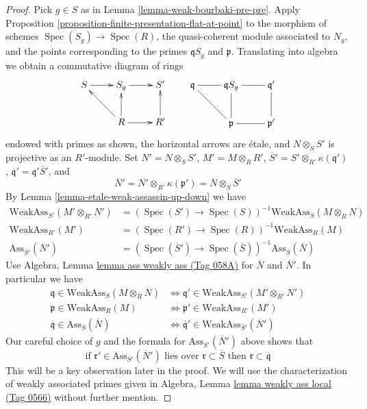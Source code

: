 \documentclass{amsart}
\theoremstyle{plain}
\theoremstyle{definition}
\theoremstyle{remark}
\numberwithin{equation}{subsection}
\def\Spec{\mathop{\mathrm{Spec}}}
\begin{document}
\begin{proof}
Pick $g \in S$ as in Lemma \ref{lemma-weak-bourbaki-pre-pre}.
Apply Proposition \ref{proposition-finite-presentation-flat-at-point}
to the morphism of schemes $\Spec(S_g) \to \Spec(R)$, the quasi-coherent
module associated to $N_g$, and the points
corresponding to the primes $\mathfrak qS_g$ and $\mathfrak p$. Translating
into algebra we obtain a commutative diagram of rings
$$
\xymatrix{
S \ar[r] & S_g \ar[r] & S' \\
& R \ar[lu] \ar[u] \ar[r] & R' \ar[u]
}
\quad\quad
\xymatrix{
\mathfrak q \ar@{-}[r] \ar@{-}[rd] &
\mathfrak qS_g \ar@{-}[d] \ar@{-}[r] & \mathfrak q' \ar@{-}[d] \\
& \mathfrak p \ar@{-}[r] & \mathfrak p'
}
$$
endowed with primes as shown, the horizontal arrows are \'etale,
and $N \otimes_S S'$ is projective as an $R'$-module. Set
$N' = N \otimes_S S'$, $M' = M \otimes_R R'$,
$\overline{S}' = S' \otimes_{R'} \kappa(\mathfrak q')$,
$\overline{\mathfrak q}' = \mathfrak q' \overline{S}'$,
and
$$
\overline{N}' = N' \otimes_{R'} \kappa(\mathfrak p') =
\overline{N} \otimes_{\overline{S}} \overline{S}'
$$
By Lemma \ref{lemma-etale-weak-assassin-up-down} we have
\begin{align*}
\text{WeakAss}_{S'}(M' \otimes_{R'} N') & =
(\Spec(S') \to \Spec(S))^{-1}\text{WeakAss}_S(M \otimes_R N) \\
\text{WeakAss}_{R'}(M') & =
(\Spec(R') \to \Spec(R))^{-1}\text{WeakAss}_R(M) \\
\text{Ass}_{\overline{S}'}(\overline{N}') & =
(\Spec(\overline{S}') \to \Spec(\overline{S}))^{-1}
\text{Ass}_{\overline{S}}(\overline{N})
\end{align*}
Use Algebra, Lemma \href{https://stacks.math.columbia.edu/tag/058A}{lemma ass weakly ass (Tag 058A)}
for $\overline{N}$ and $\overline{N}'$. In particular we have
\begin{align*}
\mathfrak q \in \text{WeakAss}_S(M \otimes_R N)
& \Leftrightarrow
\mathfrak q' \in \text{WeakAss}_{S'}(M' \otimes_{R'} N') \\
\mathfrak p \in \text{WeakAss}_R(M)
& \Leftrightarrow
\mathfrak p' \in \text{WeakAss}_{R'}(M') \\
\overline{\mathfrak q} \in \text{Ass}_{\overline{S}}(\overline{N})
& \Leftrightarrow
\overline{\mathfrak q}' \in \text{WeakAss}_{\overline{S}'}(\overline{N}')
\end{align*}
Our careful choice of $g$ and the formula for
$\text{Ass}_{\overline{S}'}(\overline{N}')$ above shows that
\begin{equation}
\label{equation-key-observation}
\text{if }\mathfrak r' \in \text{Ass}_{\overline{S}'}(\overline{N}')
\text{ lies over }\mathfrak r \subset \overline{S}\text{ then }
\mathfrak r \subset \overline{\mathfrak q}
\end{equation}
This will be a key observation later in the proof. We will use
the characterization of weakly associated primes given in
Algebra, Lemma \href{https://stacks.math.columbia.edu/tag/0566}{lemma weakly ass local (Tag 0566)} without further mention.


\end{proof}
\end{document}
